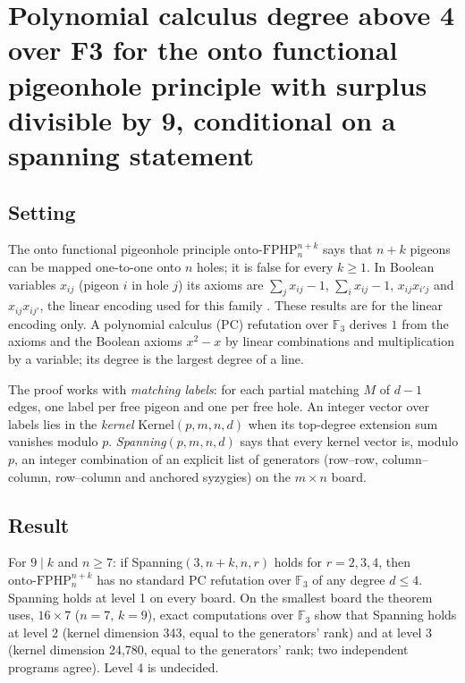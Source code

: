\documentclass{article}
\begin{document}
\section{Polynomial calculus degree above 4 over F3 for the onto functional pigeonhole principle with surplus divisible by 9, conditional on a spanning statement}
\label{sec:conditional-pc-degree-four-onto-fphp-surplus-9}

\subsection*{Setting}

The onto functional pigeonhole principle $\mathrm{onto\text{-}FPHP}^{n+k}_n$ says that $n+k$
pigeons can be mapped one-to-one onto $n$ holes; it is false for every $k\ge1$. In Boolean
variables $x_{ij}$ (pigeon $i$ in hole $j$) its axioms are $\sum_j x_{ij}-1$,
$\sum_i x_{ij}-1$, $x_{ij}x_{i'j}$ and $x_{ij}x_{ij'}$, the linear encoding used for this family
\cite{beame1998counting,razborov2001php}. These results are for the linear encoding only. A polynomial
calculus (PC) refutation over $\mathbb F_3$ derives $1$ from the axioms and the Boolean axioms
$x^2-x$ by linear combinations and multiplication by a variable; its degree is the largest degree of
a line.

The proof works with \emph{matching labels}: for each partial matching $M$ of $d-1$ edges, one label per
free pigeon and one per free hole. An integer vector over labels lies in the \emph{kernel} $\mathrm{Kernel}(p,m,n,d)$
when its top-degree extension sum vanishes modulo $p$. \emph{Spanning}$(p,m,n,d)$ says that every kernel vector
is, modulo $p$, an integer combination of an explicit list of generators (row--row, column--column,
row--column and anchored syzygies) on the $m\times n$ board.

\subsection*{Result}

For $9\mid k$ and $n\ge7$: if Spanning$(3,n+k,n,r)$ holds for $r=2,3,4$, then
$\mathrm{onto\text{-}FPHP}^{n+k}_n$ has no standard PC refutation over $\mathbb F_3$ of any degree
$d\le4$. Spanning holds at level 1 on every board. On the smallest board the theorem uses,
$16\times7$ ($n=7$, $k=9$), exact computations over $\mathbb F_3$ show that Spanning holds at level 2
(kernel dimension 343, equal to the generators' rank) and at level 3 (kernel dimension 24,780, equal to
the generators' rank; two independent programs agree). Level 4 is undecided.
\end{document}
